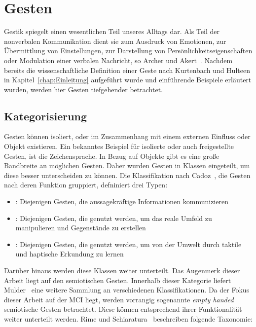\chapter{Gesten}
\label{chap:Gesten}
Gestik spiegelt einen wesentlichen Teil unseres Alltags dar. Als Teil der nonverbalen Kommunikation dient sie zum Ausdruck von Emotionen, zur \"Ubermittlung von Einstellungen, zur Darstellung von Pers\"onlichkeitseigenschaften oder Modulation einer verbalen Nachricht, so Archer und Akert~\cite{bib:archer}. 
\newline
Nachdem bereits die wissenschaftliche Definition einer Geste nach Kurtenbach und Hulteen in Kapitel~\ref{chap:Einleitung} aufgef\"uhrt wurde und einf\"uhrende Beispiele erl\"autert wurden, werden hier Gesten tiefgehender betrachtet.

\section{Kategorisierung}
Gesten k\"onnen isoliert, oder im Zusammenhang mit einem externen Einfluss oder Objekt existieren. Ein bekanntes Beispiel f\"ur isolierte oder auch freigestellte Gesten, ist die Zeichensprache. In Bezug auf Objekte gibt es eine gro\ss e Bandbreite an m\"oglichen Gesten.
\newline
Daher wurden Gesten in Klassen eingeteilt, um diese besser unterscheiden zu k\"onnen. Die Klassifikation nach Cadoz~\cite{bib:cadoz}, die Gesten nach deren Funktion gruppiert, defniniert drei Typen:
\begin{itemize}
\item \textit{}: Diejenigen Gesten, die aussagekr\"aftige Informationen kommunizieren
\item \textit{}: Diejenigen Gesten, die genutzt werden, um das reale Umfeld zu manipulieren und Gegenst\"ande  zu erstellen
\item \textit{}: Diejenigen Gesten, die genutzt werden, um von der Umwelt durch taktile und haptische Erkundung zu lernen
\end{itemize}
Dar\"uber hinaus werden diese Klassen weiter unterteilt. Das Augenmerk dieser Arbeit liegt auf den semiotischen Gesten. Innerhalb dieser Kategorie liefert Mulder~\cite{bib:Mulder} eine weitere Sammlung an verschiedenen Klassifikationen.
\newline
Da der Fokus dieser Arbeit auf der \gls{MCI} liegt, werden vorrangig sogenannte \textit{empty handed} semiotische Gesten betrachtet. Diese k\"onnen entsprechend ihrer Funktionalit\"at weiter unterteilt werden. Rime und Schiaratura~\cite{bib:rime} beschreiben folgende Taxonomie:
